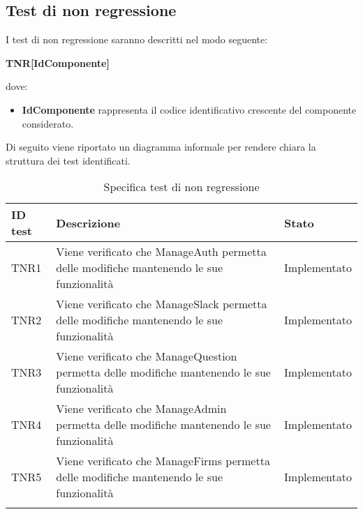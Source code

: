 \documentclass[../PianoDiQualifica_v3.0.0.tex]{subfiles}
\begin{document}
	\subsection{Test di non regressione}
	I test di non regressione saranno descritti nel modo seguente:
	\begin{center}
		\textbf{TNR[IdComponente]}
	\end{center}
	dove:
	\begin{itemize}
		\item \textbf{IdComponente} rappresenta il codice identificativo crescente del componente considerato.
	\end{itemize}
	Di seguito viene riportato un diagramma informale per rendere chiara la struttura dei test identificati.
	\\
	\begin{longtable}[c] { >{\centering\arraybackslash}p{4cm} p{7cm} >{\centering\arraybackslash}p{4cm}}
		\toprule
		\centerline{\textbf{ID test}} & \centerline{\textbf{Descrizione}} & \centerline{\textbf{Stato}} \\
			\midrule
			TNR1 & Viene verificato che ManageAuth permetta delle modifiche mantenendo le sue funzionalità & Implementato \\
			\addlinespace[0.3em]
			\midrule
			\addlinespace[0.3em]
			TNR2 & Viene verificato che ManageSlack permetta delle modifiche mantenendo le sue funzionalità & Implementato \\
			\addlinespace[0.3em]
			\midrule
			\addlinespace[0.3em]
			TNR3 & Viene verificato che ManageQuestion permetta delle modifiche mantenendo le sue funzionalità & Implementato \\
			\addlinespace[0.3em]
			\midrule
			\addlinespace[0.3em]
			TNR4 & Viene verificato che ManageAdmin permetta delle modifiche mantenendo le sue funzionalità & Implementato \\
			\addlinespace[0.3em]
			\midrule
			\addlinespace[0.3em]
			TNR5 & Viene verificato che ManageFirms permetta delle modifiche mantenendo le sue funzionalità & Implementato \\
			\bottomrule
			\caption{Specifica test di non regressione}
	\end{longtable}
\end{document}

